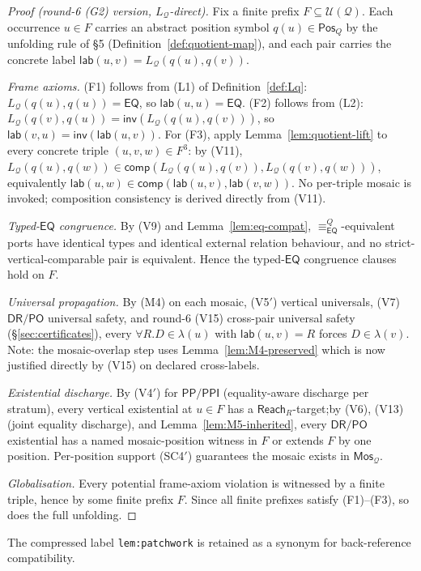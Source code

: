 \documentclass[11pt]{article}
\newcommand{\EQ}{\mathsf{EQ}}
\newcommand{\DR}{\mathsf{DR}}
\newcommand{\PO}{\mathsf{PO}}
\newcommand{\PP}{\mathsf{PP}}
\newcommand{\PPI}{\mathsf{PPI}}
\newcommand{\Inv}{\mathsf{inv}}
\newcommand{\comp}{\mathsf{comp}}
\newcommand{\Q}{\mathcal Q}
\newcommand{\U}{\mathcal U}
\newcommand{\Mos}{\mathsf{Mos}}
\newcommand{\Reach}{\mathrel{\mathsf{Reach}}}
\newcommand{\eqc}{\equiv_{\EQ}}
\newcommand{\lab}{\mathsf{lab}}
\newcommand{\Pos}{\mathsf{Pos}}
\begin{document}
\begin{proof}[Proof (round-6 (G2) version, $L_\Q$-direct)]
Fix a finite prefix $F\subseteq\U(\Q)$.  Each occurrence $u\in F$
carries an abstract position symbol $q(u)\in\Pos_Q$ by the
unfolding rule of \S5 (Definition~\ref{def:quotient-map}), and
each pair carries the concrete label
$\lab(u,v)=L_\Q(q(u),q(v))$.

\emph{Frame axioms.}  (F1) follows from (L1) of
Definition~\ref{def:Lq}: $L_\Q(q(u),q(u))=\EQ$, so
$\lab(u,u)=\EQ$.  (F2) follows from (L2):
$L_\Q(q(v),q(u))=\Inv(L_\Q(q(u),q(v)))$, so
$\lab(v,u)=\Inv(\lab(u,v))$.  For (F3), apply
Lemma~\ref{lem:quotient-lift} to every concrete triple
$(u,v,w)\in F^3$: by (V11), $L_\Q(q(u),q(w))\in\comp(L_\Q(q(u),q(v)),
L_\Q(q(v),q(w)))$, equivalently $\lab(u,w)\in\comp(\lab(u,v),
\lab(v,w))$.  No per-triple mosaic is invoked; composition
consistency is derived directly from (V11).

\emph{Typed-$\EQ$ congruence.}  By (V9) and
Lemma~\ref{lem:eq-compat}, $\eqc^{Q}$-equivalent ports have
identical types and identical external relation behaviour, and no
strict-vertical-comparable pair is equivalent.  Hence the typed-$\EQ$
congruence clauses hold on $F$.

\emph{Universal propagation.}  By (M4) on each mosaic, (V5$'$)
vertical universals, (V7) $\DR/\PO$ universal safety, and round-6
(V15) cross-pair universal safety (\S\ref{sec:certificates}), every
$\forall R.D\in\lambda(u)$ with $\lab(u,v)=R$ forces $D\in\lambda(v)$.
Note: the mosaic-overlap step uses Lemma~\ref{lem:M4-preserved}
which is now justified directly by (V15) on declared cross-labels.

\emph{Existential discharge.}  By (V4$'$) for $\PP/\PPI$
(equality-aware discharge per stratum), every vertical existential
at $u\in F$ has a $\Reach_R$-target;\@ by (V6), (V13) (joint
equality discharge), and Lemma~\ref{lem:M5-inherited}, every
$\DR/\PO$ existential has a named mosaic-position witness in
$F$ or extends $F$ by one position.  Per-position support (SC4$'$)
guarantees the mosaic exists in $\Mos_\Q$.

\emph{Globalisation.}  Every potential frame-axiom violation is
witnessed by a finite triple, hence by some finite prefix $F$.
Since all finite prefixes satisfy (F1)--(F3), so does the full
unfolding.
\end{proof}

The compressed label \texttt{lem:patchwork} is retained as a synonym
for back-reference compatibility.
\end{document}
